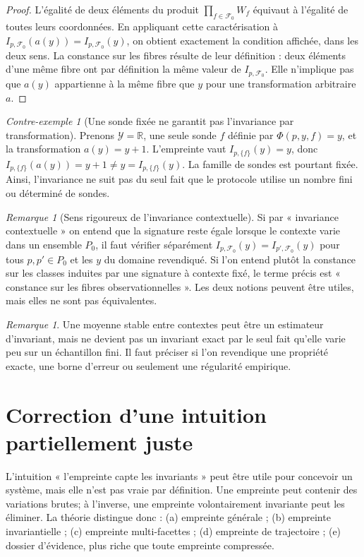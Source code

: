 \documentclass[11pt,oneside]{book}
\theoremstyle{definition}
\theoremstyle{remark}
\newtheorem{remarque}[theoreme]{Remarque}
\newtheorem{contreexemple}[theoreme]{Contre-exemple}
\newcommand{\Y}{\mathcal Y}
\newcommand{\Fcal}{\mathcal F}
\newcommand{\1}{\mathbf 1}
\begin{document}
\begin{proof}
L'égalité de deux éléments du produit $\prod_{f\in\Fcal_0}W_f$ équivaut à l'égalité de toutes leurs coordonnées. En appliquant cette caractérisation à $I_{p,\Fcal_0}(a(y))=I_{p,\Fcal_0}(y)$, on obtient exactement la condition affichée, dans les deux sens. La constance sur les fibres résulte de leur définition : deux éléments d'une même fibre ont par définition la même valeur de $I_{p,\Fcal_0}$. Elle n'implique pas que $a(y)$ appartienne à la même fibre que $y$ pour une transformation arbitraire $a$.
\end{proof}
\begin{contreexemple}[Une sonde fixée ne garantit pas l'invariance par transformation]
Prenons $\Y=\mathbb R$, une seule sonde $f$ définie par $\Phi(p,y,f)=y$, et la transformation $a(y)=y+1$. L'empreinte vaut $I_{p,\{f\}}(y)=y$, donc $I_{p,\{f\}}(a(y))=y+1\ne y=I_{p,\{f\}}(y)$. La famille de sondes est pourtant fixée. Ainsi, l'invariance ne suit pas du seul fait que le protocole utilise un nombre fini ou déterminé de sondes.
\end{contreexemple}
\begin{remarque}[Sens rigoureux de l'invariance contextuelle]
Si par « invariance contextuelle » on entend que la signature reste égale lorsque le contexte varie dans un ensemble $P_0$, il faut vérifier séparément $I_{p,\Fcal_0}(y)=I_{p',\Fcal_0}(y)$ pour tous $p,p'\in P_0$ et les $y$ du domaine revendiqué. Si l'on entend plutôt la constance sur les classes induites par une signature à contexte fixé, le terme précis est « constance sur les fibres observationnelles ». Les deux notions peuvent être utiles, mais elles ne sont pas équivalentes.
\end{remarque}
\begin{remarque}
Une moyenne stable entre contextes peut être un estimateur d'invariant, mais ne devient pas un invariant exact par le seul fait qu'elle varie peu sur un échantillon fini. Il faut préciser si l'on revendique une propriété exacte, une borne d'erreur ou seulement une régularité empirique.
\end{remarque}

\section{Correction d'une intuition partiellement juste}
L'intuition « l'empreinte capte les invariants » peut être utile pour concevoir un système, mais elle n'est pas vraie par définition. Une empreinte peut contenir des variations brutes; à l'inverse, une empreinte volontairement invariante peut les éliminer. La théorie distingue donc : (a) empreinte générale ; (b) empreinte invariantielle ; (c) empreinte multi-facettes ; (d) empreinte de trajectoire ; (e) dossier d'évidence, plus riche que toute empreinte compressée.
\end{document}
